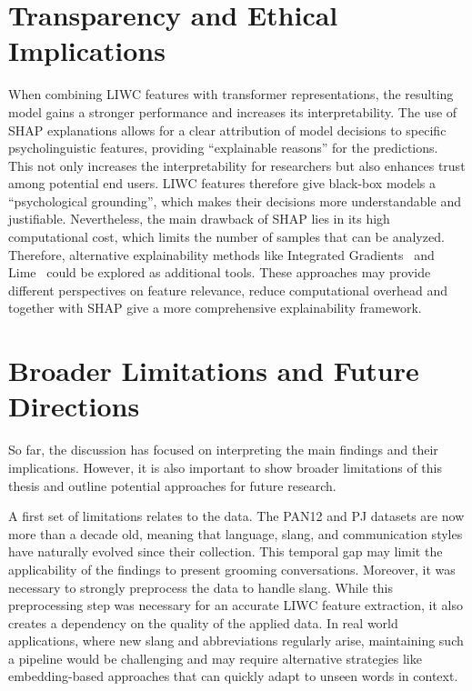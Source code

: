 \section{Transparency and Ethical Implications}

When combining LIWC features with transformer representations, the resulting model gains a stronger performance and increases its interpretability. The use of SHAP explanations allows for a clear attribution of model decisions to specific psycholinguistic features, providing “explainable reasons” for the predictions. This not only increases the interpretability for researchers but also enhances trust among potential end users. LIWC features therefore give black-box models a “psychological grounding”, which makes their decisions more understandable and justifiable. Nevertheless, the main drawback of SHAP lies in its high computational cost, which limits the number of samples that can be analyzed. Therefore, alternative explainability methods like Integrated Gradients~\cite{integratedgradients} and Lime~\cite{ribeiro2016lime} could be explored as additional tools. These approaches may provide different perspectives on feature relevance, reduce computational overhead and together with SHAP give a more comprehensive explainability framework.
\section{Broader Limitations and Future Directions}

So far, the discussion has focused on interpreting the main findings and their implications. However, it is also important to show broader limitations of this thesis and outline potential approaches for future research.  

A first set of limitations relates to the data. The PAN12 and PJ datasets are now more than a decade old, meaning that language, slang, and communication styles have naturally evolved since their collection. This temporal gap may limit the applicability of the findings to present grooming conversations. Moreover, it was necessary to strongly preprocess the data to handle slang. While this preprocessing step was necessary for an accurate LIWC feature extraction, it also creates a dependency on the quality of the applied data. In real world applications, where new slang and abbreviations regularly arise, maintaining such a pipeline would be challenging and may require alternative strategies like embedding-based approaches that can quickly adapt to unseen words in context.  

